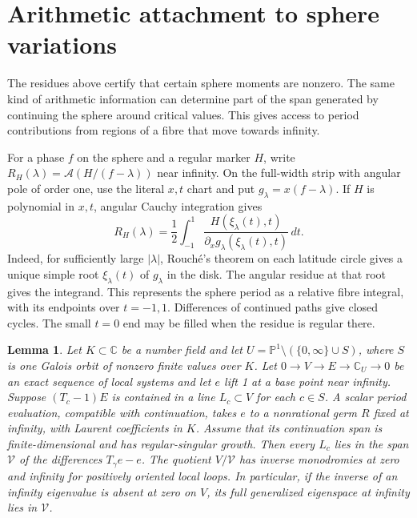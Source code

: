 \documentclass[11pt]{article}
\newtheorem{lemma}[theorem]{Lemma}
\newcommand{\A}{\mathcal A}
\begin{document}
\section{Arithmetic attachment to sphere variations}
\label{sec:arithmetic-attachment}

The residues above certify that certain sphere moments are
nonzero. The same kind of arithmetic information can determine
part of the span generated by continuing the sphere around
critical values. This gives access to period contributions
from regions of a fibre that move towards infinity.

For a phase \(f\) on the sphere and a regular marker \(H\), write
\(R_H(\lambda)=\A(H/(f-\lambda))\) near infinity. On the
full-width strip with angular pole of order one, use the literal
\(x,t\) chart and put \(g_\lambda=x(f-\lambda)\).
If \(H\) is polynomial in \(x,t\), angular Cauchy integration
gives
\[
 R_H(\lambda)=\frac12\int_{-1}^1
 \frac{H(\xi_\lambda(t),t)}{\partial_xg_\lambda(\xi_\lambda(t),t)}\,dt .
\]
Indeed, for sufficiently large \(|\lambda|\), Rouch\'e's theorem
on each latitude circle gives a unique simple root
\(\xi_\lambda(t)\) of \(g_\lambda\) in the disk. The angular
residue at that root gives the integrand. This represents the
sphere period as a relative fibre integral, with its endpoints
over \(t=-1,1\). Differences of continued paths give closed
cycles. The small \(t=0\) end may be filled when the residue is
regular there.

\begin{lemma}\label{lem:arithmetic-attachment}
Let \(K\subset\mathbb C\) be a number field and let
\(U=\mathbb P^1\setminus(\{0,\infty\}\cup S)\), where \(S\)
is one Galois orbit of nonzero finite values over \(K\).
Let \(0\to V\to E\to\mathbb C_U\to0\) be an exact sequence
of local systems and let \(e\) lift 1 at a base point near infinity.
Suppose \((T_c-1)E\) is contained in a line \(L_c\subset V\)
for each \(c\in S\). A scalar period evaluation, compatible
with continuation, takes \(e\) to a nonrational germ \(R\)
fixed at infinity, with Laurent coefficients in \(K\).
Assume that its continuation span is finite-dimensional and
has regular-singular growth. Then every \(L_c\) lies in the
span \(\mathcal V\) of the differences \(T_\gamma e-e\).
The quotient \(V/\mathcal V\) has inverse monodromies at
zero and infinity for positively oriented local loops.
In particular, if the inverse of an infinity eigenvalue
is absent at zero on \(V\), its full generalized eigenspace
at infinity lies in \(\mathcal V\).
\end{lemma}
\end{document}
